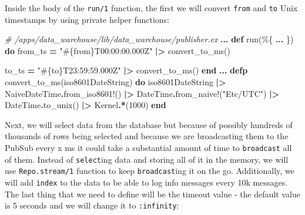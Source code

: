 \documentclass[
]{book}
\newenvironment{Shaded}{\begin{snugshade}}{\end{snugshade}}
\newcommand{\CommentTok}[1]{\textcolor[rgb]{0.56,0.35,0.01}{\textit{#1}}}
\newcommand{\ConstantTok}[1]{\textcolor[rgb]{0.00,0.00,0.00}{#1}}
\newcommand{\DecValTok}[1]{\textcolor[rgb]{0.00,0.00,0.81}{#1}}
\newcommand{\KeywordTok}[1]{\textcolor[rgb]{0.13,0.29,0.53}{\textbf{#1}}}
\newcommand{\NormalTok}[1]{#1}
\newcommand{\OperatorTok}[1]{\textcolor[rgb]{0.81,0.36,0.00}{\textbf{#1}}}
\newcommand{\OtherTok}[1]{\textcolor[rgb]{0.56,0.35,0.01}{#1}}
\newcommand{\StringTok}[1]{\textcolor[rgb]{0.31,0.60,0.02}{#1}}
\begin{document}
Inside the body of the \texttt{run/1} function, the first we will convert \texttt{from} and \texttt{to} Unix timestamps by using private helper functions:

\begin{Shaded}
\begin{Highlighting}[]
  \CommentTok{\# /apps/data\_warehouse/lib/data\_warehouse/publisher.ex  }
  \OperatorTok{...}
  \KeywordTok{def}\NormalTok{ run(\%\{}
        \OperatorTok{...}
\NormalTok{      \}) }\KeywordTok{do}
\NormalTok{    from\_ts }\OperatorTok{=}
      \StringTok{"}\OtherTok{\#\{}\NormalTok{from}\OtherTok{\}}\StringTok{T00:00:00.000Z"}
      \OperatorTok{|\textgreater{}}\NormalTok{ convert\_to\_ms()}

\NormalTok{    to\_ts }\OperatorTok{=}
      \StringTok{"}\OtherTok{\#\{}\NormalTok{to}\OtherTok{\}}\StringTok{T23:59:59.000Z"}
      \OperatorTok{|\textgreater{}}\NormalTok{ convert\_to\_ms()}
  \KeywordTok{end}
  \OperatorTok{...}
  \KeywordTok{defp}\NormalTok{ convert\_to\_ms(iso8601DateString) }\KeywordTok{do}
\NormalTok{    iso8601DateString}
    \OperatorTok{|\textgreater{}} \ConstantTok{NaiveDateTime}\OperatorTok{.}\NormalTok{from\_iso8601!()}
    \OperatorTok{|\textgreater{}} \ConstantTok{DateTime}\OperatorTok{.}\NormalTok{from\_naive!(}\StringTok{"Etc/UTC"}\NormalTok{)}
    \OperatorTok{|\textgreater{}} \ConstantTok{DateTime}\OperatorTok{.}\NormalTok{to\_unix()}
    \OperatorTok{|\textgreater{}} \ConstantTok{Kernel}\OperatorTok{.*}\NormalTok{(}\DecValTok{1000}\NormalTok{)}
  \KeywordTok{end}
\end{Highlighting}
\end{Shaded}

Next, we will select data from the database but because of possibly hundreds of thousands of rows being selected and because we are broadcasting them to the PubSub every x ms it could take a substantial amount of time to \texttt{broadcast} all of them. Instead of \texttt{select}ing data and storing all of it in the memory, we will use \texttt{Repo.stream/1} function to keep \texttt{broadcast}ing it on the go. Additionally, we will add \texttt{index} to the data to be able to log info messages every 10k messages. The last thing that we need to define will be the timeout value - the default value is 5 seconds and we will change it to \texttt{:infinity}:
\end{document}
